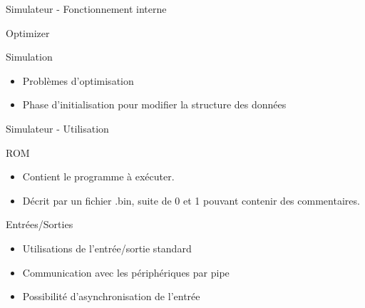 \documentclass{beamer}
\begin{document}
\begin{frame}{Simulateur - Fonctionnement interne}
	\begin{block}{Optimizer}
	\end{block}
	
	\pause
	
	\begin{block}{Simulation}
		\begin{itemize}
			\item Problèmes d'optimisation
			\item Phase d'initialisation pour modifier la structure des données
		\end{itemize}
	\end{block}
\end{frame}

\begin{frame}{Simulateur - Utilisation}
	\begin{block}{ROM}
		\begin{itemize}
			\item Contient le programme à exécuter.
			\item Décrit par un fichier .bin, suite de 0 et 1 pouvant contenir des commentaires.
		\end{itemize}
	\end{block}
	
	\pause
	
	\begin{block}{Entrées/Sorties}
		\begin{itemize}
			\item Utilisations de l'entrée/sortie standard
			\item Communication avec les périphériques par pipe
			\item Possibilité d'asynchronisation de l'entrée
		\end{itemize}
	\end{block}

\end{frame}
\end{document}
